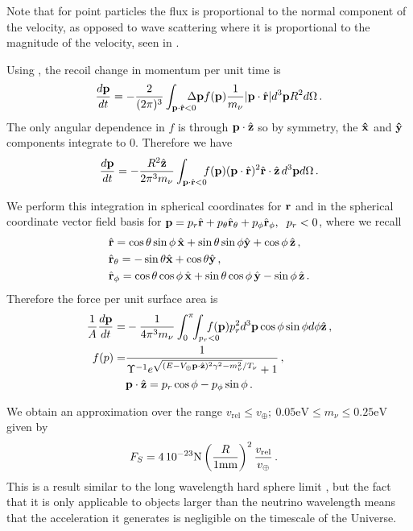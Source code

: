 Note that for point particles the flux is proportional to the normal component of the velocity, as opposed to wave scattering where it is proportional to the magnitude of the velocity, seen in .

Using , the recoil change in momentum per unit time is  
\begin{equation}
\frac{d{\bf p}}{dt}= -\frac{2}{(2\pi)^3}\int_{{\bf p}\cdot \hat{\bf r}<0} \!\!\!\!\!\!\Delta {\bf p}  f({\bf p}) \frac{1}{m_\nu}|{\bf p}\cdot \hat{\bf r}| d^3{\bf p}R^2d\Omega\,.
\end{equation}
The only angular dependence in $f$ is through ${\bf p}\cdot \hat {\bf z}$ so by symmetry, the ${\bf \hat x}$ and ${\bf \hat y}$ components integrate to $0$.  Therefore we have
\begin{equation}
\frac{d{\bf p}}{dt}=-\frac{R^2\hat{\bf z}}{2\pi^3m_\nu}\int_{{\bf p}\cdot \hat{\bf r}<0}\!\!\!   f({\bf p}) ({\bf p}\cdot \hat{\bf r})^2 \hat {\bf r}\cdot\hat{\bf z}\, d^3{\bf p}d\Omega\,.  
\end{equation}

We perform this integration in spherical coordinates for ${\bf r}$ and in the spherical coordinate vector field basis for ${\bf p}=p_r\hat{\bf r} +p_\theta\hat{\bf r}_\theta+p_\phi\hat{\bf r}_\phi,\hspace{2mm} p_r<0$, where we recall
\begin{align}
&\hat{\bf r}=\cos  \theta \sin \phi \, \hat{\bf x}+\sin \theta \sin \phi \hat{\bf y}+\cos  \phi\,\hat{\bf z}\notag\,,\\
&\hat{\bf r}_\theta=-\sin \theta \hat{\bf x}+\cos \theta \hat{\bf y}\,,\\
&\hat{\bf r}_\phi=\cos \theta \cos \phi\,\hat{\bf x}+\sin \theta \cos \phi \,\hat{\bf y}-\sin \phi \, \hat{\bf z}\notag\,.
\end{align}
Therefore the force per unit surface area is
\begin{align}
\frac{1}{A}\frac{d{\bf p}}{dt}=&-\frac{1}{4\pi^3 m_\nu}\int_0^\pi\!\!\int_{p_r<0}\!\!\!\!\!\!\!\! f({\bf p}) p_r^2  d^3{\bf p}\cos \phi \sin \phi  d\phi\hat{\bf z}\,,\notag\\
f({\bf}p)=&\frac{1}{  \Upsilon^{-1}e^{\sqrt{( E-V_\oplus {\bf p}\cdot \hat {\bf z})^2\gamma^2-m_\nu^2}/T_\nu}+1 }\,,\\
          &{\bf p}\cdot\hat{\bf z}=p_r\cos \phi-p_\phi\sin\phi \,.\notag
\end{align}

We obtain an approximation over the range $v_{\text{rel}}\leq v_\oplus ;\ 0.05\text{eV}\leq m_\nu\leq 0.25\text{eV}$ given by
\begin{align}
&F_S =  4\,10^{-23} \text{N}\left(\frac{R}{1{\rm mm}}\right)^2\frac{v_{\text{rel}}}{ v_\oplus}\,.
\end{align}
This is a result similar to the long wavelength hard sphere limit , but the fact that it is only applicable to objects larger than the neutrino wavelength means that the acceleration it generates is negligible on the timescale of the Universe.

